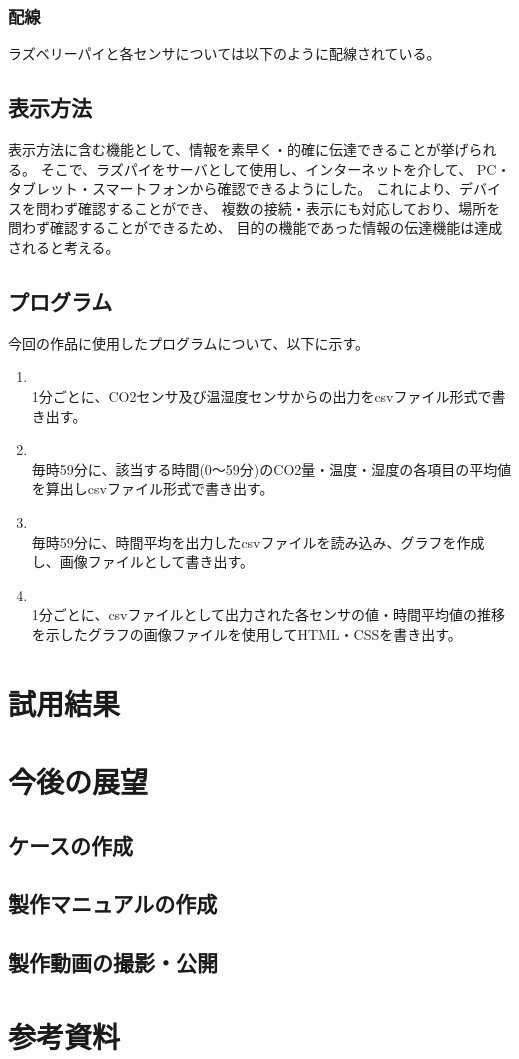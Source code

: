 \documentclass[a4paper]{jsarticle}
\begin{document}
\subsubsection{配線}
ラズベリーパイと各センサについては以下のように配線されている。
\subsection{表示方法}
表示方法に含む機能として、情報を素早く・的確に伝達できることが挙げられる。
そこで、ラズパイをサーバとして使用し、インターネットを介して、
PC・タブレット・スマートフォンから確認できるようにした。
これにより、デバイスを問わず確認することができ、
複数の接続・表示にも対応しており、場所を問わず確認することができるため、
目的の機能であった情報の伝達機能は達成されると考える。
\subsection{プログラム}
今回の作品に使用したプログラムについて、以下に示す。
\begin{enumerate}[(1)]
    \item {}\\
    1分ごとに、CO2センサ及び温湿度センサからの出力をcsvファイル形式で書き出す。\\
    \item {}\\
    毎時59分に、該当する時間(0～59分)のCO2量・温度・湿度の各項目の平均値を算出しcsvファイル形式で書き出す。\\
    \item {}\\
    毎時59分に、時間平均を出力したcsvファイルを読み込み、グラフを作成し、画像ファイルとして書き出す。\\
    \item {}\\
    1分ごとに、csvファイルとして出力された各センサの値・時間平均値の推移を示したグラフの画像ファイルを使用してHTML・CSSを書き出す。\\
\end{enumerate}
\section{試用結果}
\section{今後の展望}
\subsection{ケースの作成}
\subsection{製作マニュアルの作成}
\subsection{製作動画の撮影・公開}
\section{参考資料}
\end{document}
